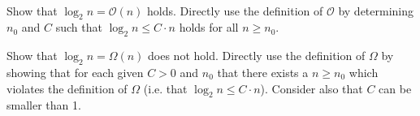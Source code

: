  \\
Show that $\log_2 n = \mathcal{O}(n)$ holds.
Directly use the definition of $\mathcal{O}$ by determining $n_0$ and $C$ such
that $\log_2 n \leq C \cdot n$ holds for all $n \geq n_0$.

Show that $\log_2 n = \Omega (n)$ does not hold.
Directly use the definition of $\Omega$ by showing that for each given $C > 0$
and $n_0$ that there exists a $n \geq n_0$ which violates the definition of
$\Omega$ (i.e. that $\log_2 n \leq C \cdot n$).
Consider also that $C$ can be smaller than 1.